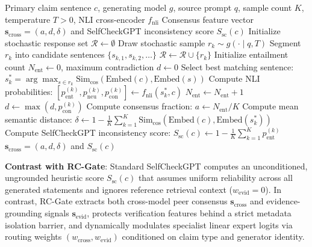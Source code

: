 \documentclass[pdflatex,sn-mathphys,Numbered]{sn-jnl}
\begin{document}
\begin{algorithm}[htbp]
\caption{Sourced Baseline: SelfCheckGPT with NLI Sampling Consistency (Manakul et al., 2023)}\label{alg:peer_consistency}
\begin{algorithmic}[1]
\Require Primary claim sentence $c$, generating model $g$, source prompt $q$, sample count $K$, temperature $T > 0$, NLI cross-encoder $f_{\mathrm{nli}}$
\Ensure Consensus feature vector $\mathbf{s}_{\mathrm{cross}} = (a, d, \delta)$ and SelfCheckGPT inconsistency score $S_{\mathrm{sc}}(c)$
\State Initialize stochastic response set $\mathcal{R} \leftarrow \emptyset$
    \State Draw stochastic sample $r_k \sim g(\cdot \mid q, T)$
    \State Segment $r_k$ into candidate sentences $\{s_{k,1}, s_{k,2}, \dots\}$
    \State $\mathcal{R} \leftarrow \mathcal{R} \cup \{r_k\}$
\EndFor
\State Initialize entailment count $N_{\mathrm{ent}} \leftarrow 0$, maximum contradiction $d \leftarrow 0$
    \State Select best matching sentence: $s_{k}^* = \arg\max_{s \in r_k} \mathrm{Sim}_{\mathrm{cos}}(\mathrm{Embed}(c), \mathrm{Embed}(s))$
    \State Compute NLI probabilities: $[p_{\mathrm{ent}}^{(k)}, p_{\mathrm{neu}}^{(k)}, p_{\mathrm{con}}^{(k)}] \leftarrow f_{\mathrm{nli}}(s_{k}^*, c)$
        \State $N_{\mathrm{ent}} \leftarrow N_{\mathrm{ent}} + 1$
    \EndIf
    \State $d \leftarrow \max(d, p_{\mathrm{con}}^{(k)})$
\EndFor
\State Compute consensus fraction: $a \leftarrow N_{\mathrm{ent}} / K$
\State Compute mean semantic distance: $\delta \leftarrow 1 - \frac{1}{K} \sum_{k=1}^K \mathrm{Sim}_{\mathrm{cos}}(\mathrm{Embed}(c), \mathrm{Embed}(s_k^*))$
\State Compute SelfCheckGPT inconsistency score: $S_{\mathrm{sc}}(c) \leftarrow 1 - \frac{1}{K} \sum_{k=1}^K p_{\mathrm{ent}}^{(k)}$
\State \Return $\mathbf{s}_{\mathrm{cross}} = (a, d, \delta)$ and $S_{\mathrm{sc}}(c)$
\end{algorithmic}
\end{algorithm}

\noindent \textbf{Contrast with RC-Gate}: Standard SelfCheckGPT computes an unconditioned, ungrounded heuristic score $S_{\mathrm{sc}}(c)$ that assumes uniform reliability across all generated statements and ignores reference retrieval context ($w_{\mathrm{evid}} = 0$). In contrast, RC-Gate extracts both cross-model peer consensus $\mathbf{s}_{\mathrm{cross}}$ and evidence-grounding signals $\mathbf{s}_{\mathrm{evid}}$, protects verification features behind a strict metadata isolation barrier, and dynamically modulates specialist linear expert logits via routing weights $(w_{\mathrm{cross}}, w_{\mathrm{evid}})$ conditioned on claim type and generator identity.
\end{document}
